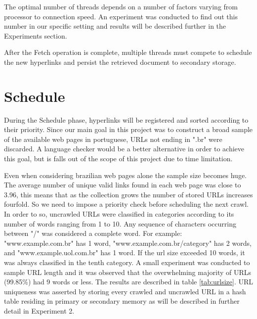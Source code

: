 \documentclass{report}
\begin{document}
The optimal number of threads depends on a number of factors varying from processor to connection speed.
An experiment was conducted to find out this number in our specific setting and results will be described
further in the Experiments section.

After the Fetch operation is complete, multiple threads must compete to schedule the new
hyperlinks and persist the retrieved document to secondary storage.

\section{Schedule}

During the Schedule phase, hyperlinks will be registered and sorted according to their priority.
Since our main goal in this project was to construct a broad sample of the available web pages
in portuguese, URLs not ending in ".br" were discarded. A language checker would be a better 
alternative in order to achieve this goal, but is falls out of the scope of this project due 
to time limitation. 

Even when considering brazilian web pages alone the sample size becomes huge. The average
number of unique valid links found in each web page was close to 3.96, this means that
as the collection grows the number of stored URLs increases fourfold. So we need to impose
a priority check before scheduling the next crawl. In order to so, uncrawled URLs
were classified in categories according to its number of words ranging from 1 to 10. Any sequence of 
characters occurring between "/" was considered a complete word. For example: 
"www.example.com.br" has 1 word, "www.example.com.br/category" has 2 words, and 
"www.example.uol.com.br" has 1 word. If the url size exceeded 10 words, it was always classified 
in the tenth category. A small experiment was conducted to sample URL length and it was observed that
the overwhelming majority of URLs (99.85\%) had 9 words or less. The results are described in table \ref{tab:urlsize}. 
URL uniqueness was asserted by storing every crawled and uncrawled URL in a hash table residing in primary or
secondary memory as will be described in further detail in Experiment 2.
\end{document}
